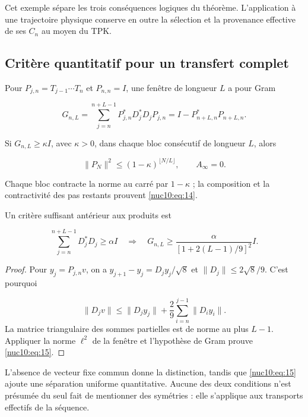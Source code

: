 Cet exemple sépare les trois conséquences logiques du théorème. L’application
à une trajectoire physique conserve en outre la sélection et la
provenance effective de ses \(C_n\) au moyen du TPK.

\subsection{Critère quantitatif pour un transfert complet}

Pour \(P_{j,n}=T_{j-1}\cdots T_n\) et \(P_{n,n}=I\), une fenêtre de longueur \(L\) a pour Gram



\[
G_{n,L}=\sum_{j=n}^{n+L-1}P_{j,n}^*D_j^*D_jP_{j,n}
=I-P_{n+L,n}^*P_{n+L,n}.
\]



Si \(G_{n,L}\geq\kappa I\), avec \(\kappa>0\), dans chaque bloc consécutif de longueur \(L\), alors



\begin{equation}
\|P_N\|^2\le(1-\kappa)^{\lfloor N/L\rfloor},\qquad A_\infty=0.
\label{nuc10:eq:14}
\end{equation}



Chaque bloc contracte la norme au carré par \(1-\kappa\) ; la composition et la contractivité des pas restants prouvent \eqref{nuc10:eq:14}.

Un critère suffisant antérieur aux produits est



\begin{equation}
\sum_{j=n}^{n+L-1}D_j^*D_j\ge\alpha I
\quad\Longrightarrow\quad
G_{n,L}\ge\frac{\alpha}{[1+2(L-1)/9]^2}I.
\label{nuc10:eq:15}
\end{equation}



\begin{proof}
Pour \(y_j=P_{j,n}v\), on a
\(y_{j+1}-y_j=D_jy_j/\sqrt8\) et \(\|D_j\|\leq2\sqrt8/9\). C’est pourquoi

\[
\|D_jv\|\leq\|D_jy_j\|+\frac29\sum_{i=n}^{j-1}\|D_iy_i\|.
\]
La matrice triangulaire des sommes partielles est de norme au plus \(L-1\).
Appliquer la norme \(\ell^2\) de la fenêtre et l’hypothèse de Gram prouve \eqref{nuc10:eq:15}.

\end{proof}

L’absence de vecteur fixe commun donne la distinction, tandis que \eqref{nuc10:eq:15} ajoute une séparation uniforme quantitative. Aucune des deux conditions n’est présumée du seul fait de mentionner des symétries : elle s’applique aux transports effectifs de la séquence.


